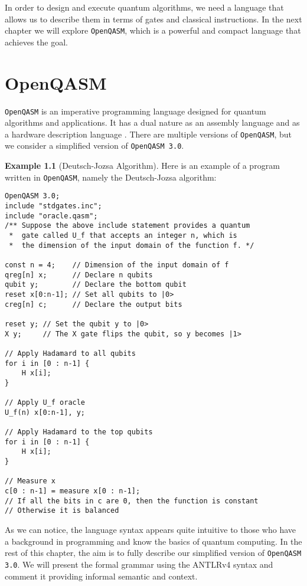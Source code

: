 \documentclass[12pt,a4paper]{report}
\theoremstyle{definition}
\theoremstyle{definition}
\newtheorem{example}{Example}[section]
\theoremstyle{definition}
\begin{document}
In order to design and execute quantum algorithms, we need a language that allows us to describe them in terms of gates and classical instructions. In the next chapter we will explore \texttt{OpenQASM}, which is a powerful and compact language that achieves the goal.









\chapter{OpenQASM}
\texttt{OpenQASM} is an imperative programming language designed for quantum algorithms and applications. It has a dual nature as an assembly language and as a hardware description language \cite{qasm}. There are multiple versions of \texttt{OpenQASM}, but we consider a simplified version of \texttt{OpenQASM 3.0}.\par
\begin{example}[Deutsch-Jozsa Algorithm] Here is an example of a program written in \texttt{OpenQASM}, namely the Deutsch-Jozsa algorithm:
\begin{lstlisting}
OpenQASM 3.0;
include "stdgates.inc";
include "oracle.qasm";
/** Suppose the above include statement provides a quantum 
 *  gate called U_f that accepts an integer n, which is
 *  the dimension of the input domain of the function f. */

const n = 4;    // Dimension of the input domain of f
qreg[n] x;      // Declare n qubits
qubit y;        // Declare the bottom qubit
reset x[0:n-1]; // Set all qubits to |0>
creg[n] c;      // Declare the output bits

reset y; // Set the qubit y to |0>
X y;     // The X gate flips the qubit, so y becomes |1>

// Apply Hadamard to all qubits
for i in [0 : n-1] {
    H x[i];
}

// Apply U_f oracle
U_f(n) x[0:n-1], y;

// Apply Hadamard to the top qubits
for i in [0 : n-1] {
    H x[i];
}

// Measure x
c[0 : n-1] = measure x[0 : n-1];
// If all the bits in c are 0, then the function is constant
// Otherwise it is balanced
\end{lstlisting}
\end{example}

As we can notice, the language syntax appears quite intuitive to those who have a background in programming and know the basics of quantum computing. In the rest of this chapter, the aim is to fully describe our simplified version of \texttt{OpenQASM 3.0}. We will present the formal grammar using the ANTLRv4 syntax \cite{antlr} and comment it providing informal semantic and context.
\end{document}
